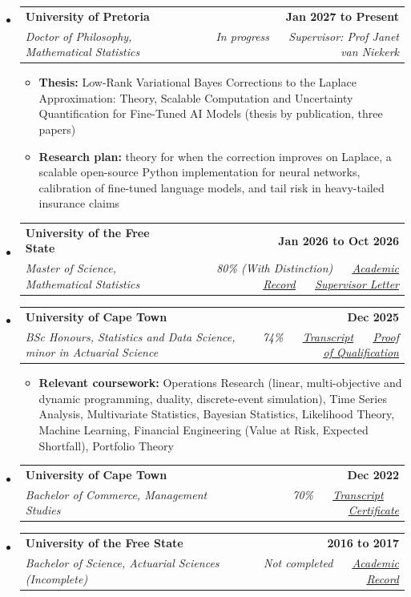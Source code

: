 \documentclass[letterpaper,11pt]{article}
\makeatletter
\newcommand{\resumeItem}[1]{
  \item\small{
    {#1 \vspace{-1pt}}
  }
}
\newcommand{\resumeSubheading}[4]{
  \vspace{-2pt}\item
    \begin{tabular*}{1.0\textwidth}[t]{l@{\extracolsep{\fill}}r}
      \textbf{\large#1} & \textbf{\small #2} \\
      \textit{\large#3} & \textit{\small #4} \\

    \end{tabular*}\vspace{-7pt}
}
\newcommand{\resumeSubHeadingListStart}{\begin{itemize}[leftmargin=0.0in, label={}]}
\newcommand{\resumeSubHeadingListEnd}{\end{itemize}}
\newcommand{\resumeItemListStart}{\begin{itemize}[leftmargin=0.1in]}
\newcommand{\resumeItemListEnd}{\end{itemize}\vspace{-5pt}}
\makeatother
\begin{document}
\resumeSubHeadingListStart
    \resumeSubheading
      {University of Pretoria}{Jan 2027 to Present}
      {Doctor of Philosophy, Mathematical Statistics}{In progress ~\textbar~ Supervisor: Prof Janet van Niekerk}
      \resumeItemListStart
            \resumeItem{\small{\textbf{Thesis:} Low-Rank Variational Bayes Corrections to the Laplace Approximation: Theory, Scalable Computation and Uncertainty Quantification for Fine-Tuned AI Models (thesis by publication, three papers)}}
            \resumeItem{\small{\textbf{Research plan:} theory for when the correction improves on Laplace, a scalable open-source Python implementation for neural networks, calibration of fine-tuned language models, and tail risk in heavy-tailed insurance claims}}
      \resumeItemListEnd
    \vspace{3pt}
    \resumeSubheading
      {University of the Free State}{Jan 2026 to Oct 2026}
      {Master of Science, Mathematical Statistics}{80\% (With Distinction) ~\textbar~ \href{https://github.com/thabangTheActuaryCoder/Academic-Records/blob/master/UV_ACADREC_S\%20\%28Baloyi\%20Thabang\%20MSc\%29.pdf}{\color{blue}\underline{Academic Record}} ~\textbar~ \href{https://github.com/thabangTheActuaryCoder/Academic-Records/blob/master/Thabang\%20Baloyi\%20letter\%2010\%20September\%202026.pdf}{\color{blue}\underline{Supervisor Letter}}}
    \vspace{3pt}
    \resumeSubheading
      {University of Cape Town}{Dec 2025}
      {BSc Honours, Statistics and Data Science, minor in Actuarial Science}{74\% ~\textbar~ \href{https://github.com/thabangTheActuaryCoder/Academic-Records/blob/master/UCT\%20TRANSCRIPT\%202025.pdf}{\color{blue}\underline{Transcript}} ~\textbar~ \href{https://github.com/thabangTheActuaryCoder/Academic-Records/blob/master/Proof\%20of\%20Qualification\%20-\%20BSc.\%20Hons\%20Statistics\%20and\%20Data\%20Sciences.pdf}{\color{blue}\underline{Proof of Qualification}}}
      \resumeItemListStart
            \resumeItem{\small{\textbf{Relevant coursework:} Operations Research (linear, multi-objective and dynamic programming, duality, discrete-event simulation), Time Series Analysis, Multivariate Statistics, Bayesian Statistics, Likelihood Theory, Machine Learning, Financial Engineering (Value at Risk, Expected Shortfall), Portfolio Theory}}
      \resumeItemListEnd
    \vspace{2pt}
    \resumeSubheading
      {University of Cape Town}{Dec 2022}
      {Bachelor of Commerce, Management Studies}{70\% ~\textbar~ \href{https://github.com/thabangTheActuaryCoder/Academic-Records/blob/master/UCT\%20TRANSCRIPT\%202025.pdf}{\color{blue}\underline{Transcript}} ~\textbar~ \href{https://github.com/thabangTheActuaryCoder/Academic-Records/blob/master/UCT\%20CERTIFICATE.pdf}{\color{blue}\underline{Certificate}}}
    \vspace{3pt}
    \resumeSubheading
      {University of the Free State}{2016 to 2017}
      {Bachelor of Science, Actuarial Sciences \textup{(Incomplete)}}{Not completed ~\textbar~ \href{https://github.com/thabangTheActuaryCoder/Academic-Records/blob/master/UV_ACADREC_S\%20\%28Baloyi\%20Thabang\%20MSc\%29.pdf}{\color{blue}\underline{Academic Record}}}
\resumeSubHeadingListEnd
\vspace{-2pt}
\end{document}
